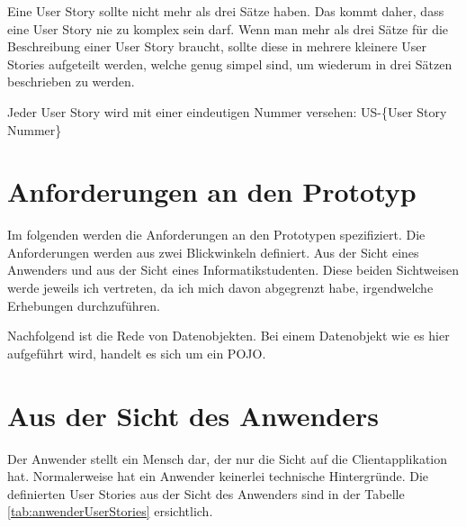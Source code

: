 \documentclass[abstracton, listof=totocnumbered,
bibliography=totocnumbered]{scrreprt}
\begin{document}
  Eine User Story sollte nicht mehr als drei Sätze haben. Das kommt daher, dass
  eine User Story nie zu komplex sein darf. Wenn man mehr als drei Sätze für die
  Beschreibung einer User Story braucht, sollte diese in mehrere kleinere User
  Stories aufgeteilt werden, welche genug simpel sind, um wiederum in drei
  Sätzen beschrieben zu werden.
  
  Jeder User Story wird mit einer eindeutigen Nummer versehen: US-\{User Story
  Nummer\}
  
  \section{Anforderungen an den Prototyp}
  
  Im folgenden werden die Anforderungen an den Prototypen spezifiziert. Die
  Anforderungen werden aus zwei Blickwinkeln definiert. Aus der Sicht eines
  Anwenders und aus der Sicht eines Informatikstudenten. Diese beiden
  Sichtweisen werde jeweils ich vertreten, da ich mich davon abgegrenzt habe,
  irgendwelche Erhebungen durchzuführen.
  
  Nachfolgend ist die Rede von Datenobjekten. Bei einem Datenobjekt wie es hier
  aufgeführt wird, handelt es sich um ein \ac{POJO}. 
  
  \newpage
  
  \section{Aus der Sicht des Anwenders}
  
  Der Anwender stellt ein Mensch dar, der nur die Sicht auf die
  Clientapplikation hat. Normalerweise hat ein Anwender keinerlei technische
  Hintergründe. Die definierten User Stories aus der Sicht des Anwenders sind in
  der Tabelle \ref{tab:anwenderUserStories} ersichtlich.
  \newline
  
\end{document}
